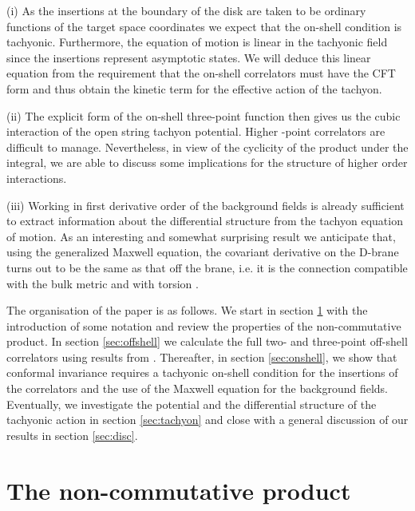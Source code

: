 \documentclass[a4paper,11pt]{article}               \def\new#1\endnew{{\bf #1}}
\begin{document}
(i) As the insertions at the boundary of the disk are taken to 
be ordinary functions of the target space coordinates \coordHE{} we
expect that the on-shell condition is tachyonic. 
Furthermore, the equation of motion is linear in the tachyonic field
since the insertions represent asymptotic states. We will deduce this
linear equation from the requirement that the on-shell correlators
must have the CFT form and thus obtain 
the kinetic term for the effective action of the tachyon. 

(ii) The explicit form of the on-shell three-point function then gives 
us the cubic interaction of the open string tachyon potential. 
Higher \coordHE{}-point correlators are difficult to manage. Nevertheless, 
in view of the cyclicity of the product under the integral, we are able to 
discuss some implications for the structure of higher order 
interactions.

(iii) Working in first derivative order of the background fields is
already sufficient to extract information about the differential structure 
from the tachyon equation of motion. As an interesting and somewhat 
surprising result we anticipate that, using the generalized Maxwell equation, 
the covariant derivative on the D-brane turns out to be the same as that off 
the brane, i.e. it is the connection compatible with the bulk metric and 
with torsion \coordHE{}.

The organisation of the paper is as follows.
We start in section \ref{sec:NCP} with the introduction of some notation 
and review the properties of the non-commutative product. In
section \ref{sec:offshell} we calculate the full two- and three-point
off-shell correlators using results from
\cite{Herbst:2001ai}. Thereafter, in section \ref{sec:onshell}, we show
that conformal invariance requires a tachyonic on-shell condition for
the insertions of the correlators and the use of the Maxwell equation for 
the background fields. Eventually, we investigate the potential and the 
differential structure of the tachyonic action in section \ref{sec:tachyon} 
and close with a general discussion of our results in section \ref{sec:disc}.


\section{The non-commutative product}
\label{sec:NCP}
\end{document}
